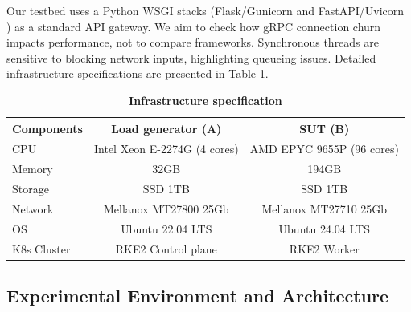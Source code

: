 \documentclass{ieeeaccess}
\begin{document}
Our testbed uses a Python WSGI stacks (Flask/Gunicorn \cite{gunicorn} and FastAPI/Uvicorn \cite{uvicorn}) as a standard API gateway. We aim to check how gRPC connection churn impacts performance, not to compare frameworks. Synchronous threads are sensitive to blocking network inputs, highlighting queueing issues. Detailed infrastructure specifications are presented in Table \ref{tab:infra}.




\begin{table}[htbp]
	\centering
	\caption{\textbf{Infrastructure specification}}
	\label{tab:infra}
	\setlength{\tabcolsep}{3pt}
		\begin{tabular}{lcc}
			\hline
			\textbf{Components}& \textbf{Load generator (A)}& \textbf{SUT (B)}\\
			\hline
			CPU & Intel Xeon E-2274G (4 cores)& AMD EPYC 9655P (96 cores)\\
			Memory & 32GB & 194GB\\
			Storage & SSD 1TB & SSD 1TB\\
			Network & Mellanox MT27800 25Gb & Mellanox MT27710 25Gb\\
			OS & Ubuntu 22.04 LTS & Ubuntu 24.04 LTS\\
			K8s Cluster & RKE2 Control plane & RKE2 Worker  \\ 
			\hline
	\end{tabular}
\end{table}


\subsection{Experimental Environment and Architecture}
\label{sec4.1}
\end{document}
